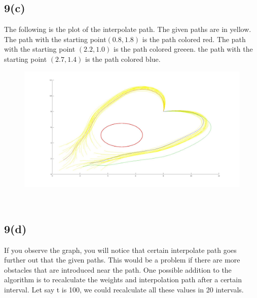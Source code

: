 \documentclass{article}
\begin{document}
\subsection*{9(c)}
The following is the plot of the interpolate path. The given paths are in yellow. The path with the starting point$(0.8, 1.8)$ is the path colored red. The path with the starting point $(2.2, 1.0)$ is the path colored greeen. the path with the starting point $(2.7, 1.4)$ is the path colored blue.
\begin{figure}[h]
\centering
\includegraphics[width=6in]{p9.jpg}
\end{figure}\\
\subsection*{9(d)}
If you observe the graph, you will notice that certain interpolate path goes further out that the given paths. This would be a problem if there are more obstacles that are introduced near the path. One possible addition to the algorithm is to recalculate the weights and interpolation path after a certain interval. Let say t is 100, we could recalculate all these values in 20 intervals. 
\end{document}
